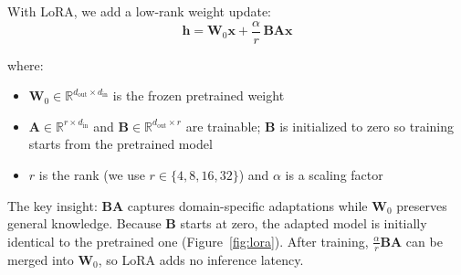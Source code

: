 \documentclass[11pt]{article}
\begin{document}
With LoRA, we add a low-rank weight update:
\begin{equation}
\mathbf{h} = \mathbf{W}_0 \mathbf{x} + \frac{\alpha}{r}\, \mathbf{B} \mathbf{A} \mathbf{x}
\end{equation}

where:
\begin{itemize}
    \item $\mathbf{W}_0 \in \mathbb{R}^{d_{\text{out}} \times d_{\text{in}}}$ is the frozen pretrained weight
    \item $\mathbf{A} \in \mathbb{R}^{r \times d_{\text{in}}}$ and $\mathbf{B} \in \mathbb{R}^{d_{\text{out}} \times r}$ are trainable; $\mathbf{B}$ is initialized to zero so training starts from the pretrained model
    \item $r$ is the rank (we use $r \in \{4, 8, 16, 32\}$) and $\alpha$ is a scaling factor
\end{itemize}

The key insight: $\mathbf{B}\mathbf{A}$ captures domain-specific adaptations while $\mathbf{W}_0$ preserves general knowledge. Because $\mathbf{B}$ starts at zero, the adapted model is initially identical to the pretrained one (Figure~\ref{fig:lora}). After training, $\frac{\alpha}{r}\mathbf{B}\mathbf{A}$ can be merged into $\mathbf{W}_0$, so LoRA adds no inference latency.
\end{document}
